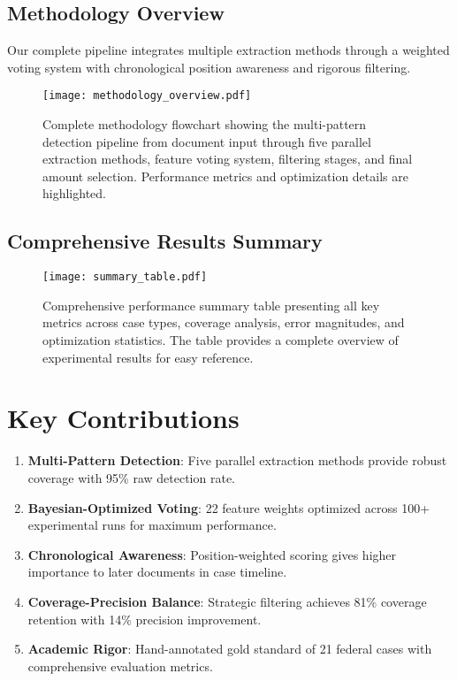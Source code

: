 \documentclass[11pt]{article}
\begin{document}
\subsection{Methodology Overview}

Our complete pipeline integrates multiple extraction methods through a weighted voting system with chronological position awareness and rigorous filtering.

\begin{figure}[H]
    \centering
    \texttt{[image: methodology\_overview.pdf]}
    \caption{Complete methodology flowchart showing the multi-pattern detection pipeline from document input through five parallel extraction methods, feature voting system, filtering stages, and final amount selection. Performance metrics and optimization details are highlighted.}
    \label{fig:methodology_overview}
\end{figure}

\subsection{Comprehensive Results Summary}

\begin{figure}[H]
    \centering
    \texttt{[image: summary\_table.pdf]}
    \caption{Comprehensive performance summary table presenting all key metrics across case types, coverage analysis, error magnitudes, and optimization statistics. The table provides a complete overview of experimental results for easy reference.}
    \label{fig:summary_table}
\end{figure}

\section{Key Contributions}

\begin{enumerate}
    \item \textbf{Multi-Pattern Detection}: Five parallel extraction methods provide robust coverage with 95\% raw detection rate.

    \item \textbf{Bayesian-Optimized Voting}: 22 feature weights optimized across 100+ experimental runs for maximum performance.

    \item \textbf{Chronological Awareness}: Position-weighted scoring gives higher importance to later documents in case timeline.

    \item \textbf{Coverage-Precision Balance}: Strategic filtering achieves 81\% coverage retention with 14\% precision improvement.

    \item \textbf{Academic Rigor}: Hand-annotated gold standard of 21 federal cases with comprehensive evaluation metrics.
\end{enumerate}
\end{document}
